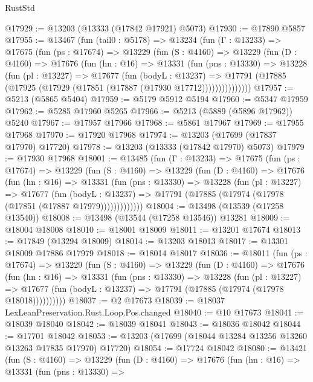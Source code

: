 \begin{lexlean}{RustStd}
\begin{coremodule}
@17929 := @13203 (@13333 (@17842 @17921) @5073)
@17930 := @17890 @5857
@17955 := @13467
    (fun (tail0 : @5178) =>
    @13234
      (fun (Γ : @13233) =>
      @17675
        (fun (ps : @17674) =>
        @13229
          (fun (S : @4160) =>
          @13229
            (fun (D : @4160) =>
            @17676
              (fun (hn : @16) =>
              @13331
                (fun (pns : @13330) =>
                @13228
                  (fun (pl : @13227) =>
                  @17677
                    (fun (bodyL : @13237) =>
                    @17791 (@17885 (@17925 (@17929 (@17851 (@17887 (@17930 @17712)))))))))))))))
@17957 := @5213 (@5865 @5404)
@17959 := @5179 @5912 @5194
@17960 := @5347 @17959
@17962 := @5285 @17960 @5265
@17966 := @5213 (@5889 (@5896 @17962)) @5240
@17967 := @17957 @17966
@17968 := @5861 @17967
@17969 := @17955 @17968
@17970 := @17920 @17968
@17974 := @13203 (@17699 (@17837 @17970) @17720)
@17978 := @13203 (@13333 (@17842 @17970) @5073)
@17979 := @17930 @17968
@18001 := @13485
    (fun (Γ : @13233) =>
    @17675
      (fun (ps : @17674) =>
      @13229
        (fun (S : @4160) =>
        @13229
          (fun (D : @4160) =>
          @17676
            (fun (hn : @16) =>
            @13331
              (fun (pns : @13330) =>
              @13228
                (fun (pl : @13227) =>
                @17677
                  (fun (bodyL : @13237) =>
                  @17791 (@17885 (@17974 (@17978 (@17851 (@17887 @17979)))))))))))))
@18004 := @13498 (@13539 (@17258 @13540))
@18008 := @13498 (@13544 (@17258 @13546)) @13281
@18009 := @18004 @18008
@18010 := @18001 @18009
@18011 := @13201 @17674
@18013 := @17849 (@13294 @18009)
@18014 := @13203 @18013
@18017 := @13301 @18009 @17886 @17979
@18018 := @18014 @18017
@18036 := @18011
    (fun (ps : @17674) =>
    @13229
      (fun (S : @4160) =>
      @13229
        (fun (D : @4160) =>
        @17676
          (fun (hn : @16) =>
          @13331
            (fun (pns : @13330) =>
            @13228
              (fun (pl : @13227) =>
              @17677 (fun (bodyL : @13237) => @17791 (@17885 (@17974 (@17978 @18018))))))))))
@18037 := @2 @17673
@18039 := @18037 LexLeanPreservation.Rust.Loop.Pos.changed
@18040 := @10 @17673
@18041 := @18039 @18040
@18042 := @18039 @18041
@18043 := @18036 @18042
@18044 := @17701 @18042
@18053 := @13203 (@17699 (@18044 @13284 @13256 @13260 @13263 @17835 @17970) @17720)
@18054 := @17724 @18042
@18080 := @13421
    (fun (S : @4160) =>
    @13229
      (fun (D : @4160) =>
      @17676
        (fun (hn : @16) =>
        @13331
          (fun (pns : @13330) =>

\end{coremodule}
\end{lexlean}
